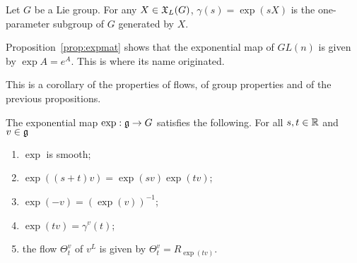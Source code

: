 \begin{exercise}
  Let $G$ be a Lie group. For any $X\in\mathfrak{X}_L(G)$, $\gamma(s) =\exp(sX)$ is the one-parameter subgroup of $G$ generated by $X$.
\end{exercise}

\begin{example}
  Proposition~\ref{prop:expmat} shows that the exponential map of $GL(n)$ is given by $\exp A = e^A$.
  This is where its name originated.
\end{example}

This is a corollary of the properties of flows, of group properties and of the previous propositions.
\begin{proposition}
  The exponential map $\exp: \mathfrak{g} \to G$ satisfies the following.
  For all $s,t\in\mathbb{R}$ and $v\in\mathfrak{g}$
  \begin{enumerate}
    \item $\exp$ is smooth;
    \item $\exp((s+t)v) = \exp(sv)\exp(tv)$;
    \item $\exp(-v) = (\exp(v))^{-1}$;
    \item $\exp(tv) =\gamma^v(t)$;
    \item the flow $\Theta_t^v$ of $v^L$ is given by $\Theta_t^v=R_{\exp(tv)}$.
  \end{enumerate}
\end{proposition}

